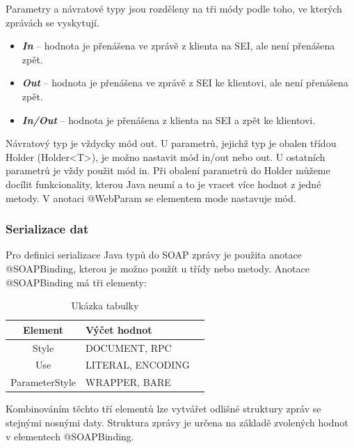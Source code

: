 \documentclass[11pt,twoside,a4paper]{book}
\begin{document}
Parametry a návratové typy jsou rozděleny na tři módy podle toho, ve kterých zprávách se
vyskytují.

\begin{itemize}
  \item \textbf{\textit{In}} – hodnota je přenášena ve zprávě z klienta na
  SEI, ale není přenášena zpět.
  \item \textbf{\textit{Out}} – hodnota je přenášena ve zprávě z SEI ke
  klientovi, ale není přenášena zpět.
  \item \textbf{\textit{In/Out}} – hodnota je přenášena z klienta na SEI a
  zpět ke klientovi.
\end{itemize}

Návratový typ je vždycky mód out. U parametrů, jejichž typ je obalen třídou Holder
(Holder<T>), je možno nastavit mód in/out nebo out. U ostatních parametrů je vždy použit
mód in. Při obalení parametrů do Holder můžeme docílit funkcionality, kterou Java neumí a to
je vracet více hodnot z jedné metody. V anotaci @WebParam se elementem mode nastavuje
mód.

\subsubsection{Serializace dat}

Pro definici serializace Java typů do SOAP zprávy je použita anotace @SOAPBinding, kterou
je možno použít u třídy nebo metody. Anotace @SOAPBinding má tři elementy:

\begin{table}[h]
\begin{center}
\begin{tabular}{|c|l|l|}
\hline
\textbf{Element} & \textbf{Výčet hodnot} \\
\hline
Style & DOCUMENT, RPC \\
\hline
Use & LITERAL, ENCODING \\
\hline
ParameterStyle & WRAPPER, BARE \\
\hline
\end{tabular}
\end{center}
\caption{Ukázka tabulky}
\label{tab:tab1}
\end{table}

Kombinováním těchto tří elementů lze vytvářet odlišné struktury zpráv se stejnými nosnými
daty. Struktura zprávy je určena na základě zvolených hodnot v elementech @SOAPBinding.
\end{document}
